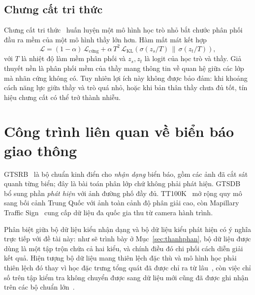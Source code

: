 \subsection{Chưng cất tri thức}

Chưng cất tri thức~\cite{hinton2015distillation} huấn luyện một mô hình học trò nhỏ bắt chước
phân phối đầu ra mềm của một mô hình thầy lớn hơn. Hàm mất mát kết hợp
\begin{equation}
\label{eq:distill}
\mathcal{L} = (1-\alpha)\,\mathcal{L}_{\text{cứng}}
            + \alpha\, T^{2}\, \mathcal{L}_{\text{KL}}\!\left(\sigma(z_s/T) \,\|\, \sigma(z_t/T)\right),
\end{equation}
với $T$ là nhiệt độ làm mềm phân phối và $z_s, z_t$ là logit của học trò và thầy. Giả thuyết nền
là phân phối mềm của thầy mang thông tin về quan hệ giữa các lớp mà nhãn cứng không có. Tuy nhiên
lợi ích này không được bảo đảm: khi khoảng cách năng lực giữa thầy và trò quá nhỏ, hoặc khi bản
thân thầy chưa đủ tốt, tín hiệu chưng cất có thể trở thành nhiễu.

\section{Công trình liên quan về biển báo giao thông}

GTSRB~\cite{stallkamp2012gtsrb} là bộ chuẩn kinh điển cho \emph{nhận dạng} biển báo, gồm các ảnh
đã cắt sát quanh từng biển; đây là bài toán phân lớp chứ không phải phát hiện.
GTSDB~\cite{houben2013gtsdb} bổ sung phần \emph{phát hiện} với ảnh đường phố đầy đủ.
TT100K~\cite{zhu2016tt100k} mở rộng quy mô sang bối cảnh Trung Quốc với ảnh toàn cảnh độ phân giải
cao, còn Mapillary Traffic Sign~\cite{ertler2020mapillary} cung cấp dữ liệu đa quốc gia thu từ
camera hành trình.

Phân biệt giữa bộ dữ liệu kiểu nhận dạng và bộ dữ liệu kiểu phát hiện có ý nghĩa trực tiếp với đề
tài này: như sẽ trình bày ở Mục~\ref{sec:thanhphan}, bộ dữ liệu được dùng là một tập trộn chứa cả
hai kiểu, và chính điều đó chi phối cách diễn giải kết quả. Hiện tượng bộ dữ liệu mang thiên lệch
đặc thù và mô hình học phải thiên lệch đó thay vì học đặc trưng tổng quát đã được chỉ ra từ
lâu~\cite{torralba2011bias}, còn việc chỉ số trên tập kiểm tra không chuyển được sang dữ liệu mới
cũng đã được ghi nhận trên các bộ chuẩn lớn~\cite{recht2019imagenetv2}.
